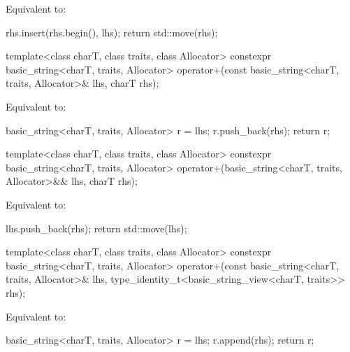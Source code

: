 \begin{itemdescr}
\pnum
\effects
Equivalent to:
\begin{codeblock}
rhs.insert(rhs.begin(), lhs);
return std::move(rhs);
\end{codeblock}
\end{itemdescr}

%
\begin{itemdecl}
template<class charT, class traits, class Allocator>
  constexpr basic_string<charT, traits, Allocator>
    operator+(const basic_string<charT, traits, Allocator>& lhs, charT rhs);
\end{itemdecl}

\begin{itemdescr}
\pnum
\effects
Equivalent to:
\begin{codeblock}
basic_string<charT, traits, Allocator> r = lhs;
r.push_back(rhs);
return r;
\end{codeblock}
\end{itemdescr}

%
\begin{itemdecl}
template<class charT, class traits, class Allocator>
  constexpr basic_string<charT, traits, Allocator>
    operator+(basic_string<charT, traits, Allocator>&& lhs, charT rhs);
\end{itemdecl}

\begin{itemdescr}
\pnum
\effects
Equivalent to:
\begin{codeblock}
lhs.push_back(rhs);
return std::move(lhs);
\end{codeblock}
\end{itemdescr}

%
\begin{itemdecl}
template<class charT, class traits, class Allocator>
  constexpr basic_string<charT, traits, Allocator>
    operator+(const basic_string<charT, traits, Allocator>& lhs,
              type_identity_t<basic_string_view<charT, traits>> rhs);
\end{itemdecl}

\begin{itemdescr}
\pnum
Equivalent to:
\begin{codeblock}
basic_string<charT, traits, Allocator> r = lhs;
r.append(rhs);
return r;
\end{codeblock}
\end{itemdescr}

